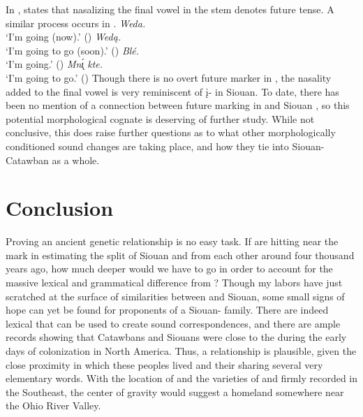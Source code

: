 \documentclass[output=paper]{LSP/langsci}
\begin{document}
In , \citet{Linn2000} states that nasalizing the final vowel in the stem denotes future tense. A similar process occurs in .
\ea
	\ea \textit{Weda.} \hfill {}\\
		`I'm going (now).' (\citealt[279]{Linn2000})
	\ex \textit{Wed\k{a}.} \hfill {}\\
		`I'm going to go (soon).' (\citealt[279]{Linn2000})
	\ex \textit{Bl\'e.} \hfill {}\\
		`I'm going.' (\citealt[75]{Ullrich2008})
	\ex \textit{Mn\k{\'\i} kte.} \hfill {}\\
		`I'm going to go.' (\citealt[75]{Ullrich2008})
	\z
\z
Though there is no overt future marker in , the nasality added to the final vowel is very reminiscent of \k{i}- in Siouan. To date, there has been no mention of a connection between future marking in  and Siouan , so this potential morphological cognate is deserving of further study. While not conclusive, this  does raise further questions as to what other morphologically conditioned sound changes are taking place, and how they tie into Siouan-Catawban as a whole.

\section{Conclusion}\label{sec:kasak:6}

Proving an ancient genetic relationship is no easy task. If \citet{ParksRankin2001} are hitting near the mark in estimating the split of Siouan and  from each other around four thousand years ago, how much deeper would we have to go in order to account for the massive lexical and grammatical difference from ? Though my labors have just scratched at the surface of similarities between  and Siouan, some small signs of hope can yet be found for proponents of a Siouan- family. There are indeed lexical  that can be used to create sound correspondences, and there are ample records showing that Catawbans and Siouans were close to the  during the early days of colonization in North America. Thus, a relationship is plausible, given the close proximity in which these peoples lived and their sharing several very elementary words. With the location of  and the varieties of  and  firmly recorded in the Southeast, the center of gravity would suggest a homeland somewhere near the Ohio River Valley.
\end{document}
